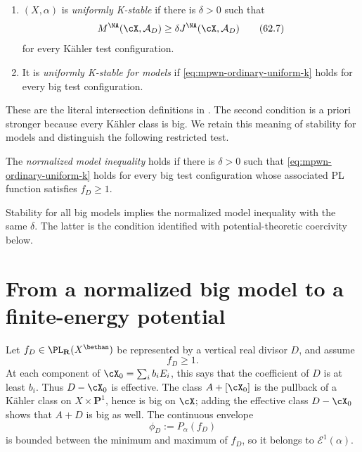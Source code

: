 \begin{definition}\label{def:mpwn-two-stabilities}
\begin{enumerate}
\item $(X,\alpha)$ is \emph{uniformly K-stable} if there is
      $\delta>0$ such that
      \[
          M^{\NA}(\cX,\mathcal A_D)\geq
          \delta J^{\NA}(\cX,\mathcal A_D)
      \tag{62.7}\label{eq:mpwn-ordinary-uniform-k}
      \]
      for every K\"ahler test configuration.
\item It is \emph{uniformly K-stable for models} if
      \eqref{eq:mpwn-ordinary-uniform-k} holds for every big test
      configuration.
\end{enumerate}
\end{definition}

These are the literal intersection definitions in
\cite[Definition~1.1.2]{MPWN25}.  The second condition is a priori
stronger because every K\"ahler class is big.  We retain this meaning
of stability for models and distinguish the following restricted test.

\begin{definition}\label{def:mpwn-normalized-model-test}
The \emph{normalized model inequality} holds if there is $\delta>0$
such that \eqref{eq:mpwn-ordinary-uniform-k} holds for every big
test configuration whose associated PL function satisfies $f_D\geq1$.
\end{definition}

Stability for all big models implies the normalized model inequality
with the same $\delta$.  The latter is the condition identified with
potential-theoretic coercivity below.

\section{From a normalized big model to a finite-energy potential}
\label{sec:mpwn-k-normalized-models}

Let $f_D\in\PL_{\mathbf R}(X^{\bethan})$ be represented by a vertical
real divisor $D$, and assume
\[
                              f_D\geq1.
\tag{62.8}\label{eq:mpwn-fd-positive}
\]
At each component of $\cX_0=\sum_i b_iE_i$, this says that the
coefficient of $D$ is at least $b_i$.  Thus $D-\cX_0$ is effective.
The class $A+[\cX_0]$ is the pullback of a K\"ahler class on
$X\times\mathbf P^1$, hence is big on $\cX$; adding the effective
class $D-\cX_0$ shows that $A+D$ is big as well.
The continuous envelope
\[
                              \phi_D:=P_\alpha(f_D)
\tag{62.9}\label{eq:mpwn-model-envelope}
\]
is bounded between the minimum and maximum of $f_D$, so it belongs
to $\mathcal E^1(\alpha)$.

